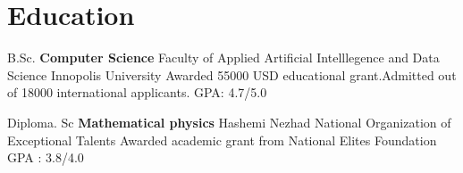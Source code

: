 \section{Education}
            {B.Sc. \textbf{Computer Science}}
            {Faculty of Applied Artificial Intelllegence and Data Science}
            {Innopolis University}
            {Awarded 55000 USD educational grant.Admitted out of 18000 international applicants.}
            {GPA: 4.7/5.0} 
  
    \vspace{10pt}
    
            {Diploma. Sc \textbf{Mathematical physics}}
            {Hashemi Nezhad}
            {National Organization of Exceptional Talents}
            {Awarded academic grant from National Elites Foundation }
            {GPA : 3.8/4.0}
